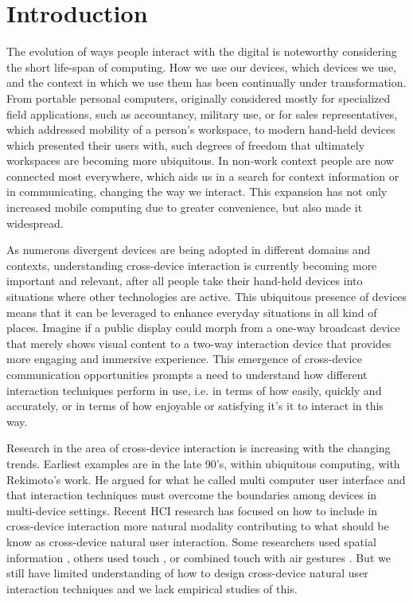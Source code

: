 \section{Introduction} \label{sec:introduction}
The evolution of ways people interact with the digital is noteworthy considering the short life-span of computing. How we use our devices, which devices we use, and the context in which we use them has been continually under transformation. From portable personal computers, originally considered mostly for specialized field applications, such as accountancy, military use, or for sales representatives, which addressed mobility of a person's workspace, to modern hand-held devices which presented their users with, such degrees of freedom that ultimately workspaces are becoming more ubiquitous. In non-work context people are now connected most everywhere, which aids us in a search for context information or in communicating, changing the way we interact. This expansion has not only increased mobile computing due to greater convenience, but also made it widespread.\cite{Francis:1997} 

As numerous divergent devices are being adopted in different domains and contexts, understanding cross-device interaction is currently becoming more important and relevant, after all people take their hand-held devices into situations where other technologies are active. This ubiquitous presence of devices means that it can be leveraged to enhance everyday situations in all kind of places. Imagine if a public display could morph from a one-way broadcast device that merely shows visual content to a two-way interaction device that provides more engaging and immersive experience. This emergence of cross-device communication opportunities prompts a need to understand how different interaction techniques perform in use, i.e. in terms of how easily, quickly and accurately, or in terms of how enjoyable or satisfying it's it to interact in this way.

Research in the area of cross-device interaction is increasing with the changing trends. Earliest examples are in the late 90's, within ubiquitous computing, with Rekimoto's work.  He argued for what he called multi computer user interface and that interaction techniques must overcome the boundaries among devices in multi-device settings\cite{Rekimoto:1998}.
Recent HCI research has focused on how to include in cross-device interaction more natural modality contributing to what should be know as cross-device natural user interaction.  Some researchers used spatial information \cite{Marquardt:2011, Marquardt:2012}, others used touch \cite{Seifert:2012}, or combined touch with air gestures \cite{Bragdon:2011} . But we still have limited understanding of how to design cross-device natural user interaction techniques and we lack empirical studies of this.

